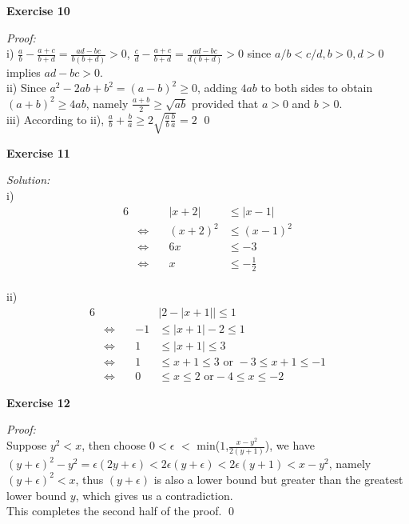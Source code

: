 \documentclass[12pt]{article}
\begin{document}
 \textbf{Exercise 10}\par
\textit{Proof: }\\
i) $\frac{a}{b}-\frac{a+c}{b+d}=\frac{ad-bc}{b(b+d)}>0$, $\frac{c}{d}-\frac{a+c}{b+d}=\frac{ad-bc}{d(b+d)}>0$ since $a/b <c/d, b>0, d>0$ implies $ad-bc>0$.\\
ii) Since $a^2-2ab+b^2=(a-b)^2\ge 0$, adding $4ab$ to both sides to obtain $(a+b)^2\ge4ab$, namely $\frac{a+b}{2}\ge\sqrt{ab}$ provided that $a>0$ and $b>0$.\\
iii) According to ii), $\frac{a}{b}+\frac{b}{a}\ge2\sqrt{\frac{a}{b}\frac{b}{a}}=2$
\qed
\par
\textbf{Exercise 11}\par
\textit{Solution: }\\
i)\begin{alignat*}{6}
&\quad &|x+2|    &\leq|x-1|\\
&\iff      \quad&(x+2)^2&\leq(x-1)^2\\
&\iff      &6x        &\leq-3\\
&\iff      &x          &\leq -\frac{1}{2}
\end{alignat*}\\
ii)\begin{alignat*}{6}
&     &   &|2-|x+1||\leq1\\
&\iff \quad&-1&\leq|x+1|-2\leq     1\\
&\iff &1 &\leq|x+1|\leq        3\\
&\iff &1 &\leq x+1\leq         3\text{ or } -3\leq x+1\leq-1\\
&\iff &0 &\leq x\leq             2\text{ or} -4\leq x\leq-2
\end{alignat*}
\par
\textbf{Exercise 12}\par
\textit{Proof: }\\
Suppose $y^2<x$, then choose $0<\epsilon$ $<$ min($1$,$\frac{x-y^2}{2(y+1)}$), we have 
$(y+\epsilon)^2-y^2= \epsilon(2y+\epsilon)<2\epsilon(y+\epsilon)<2\epsilon(y+1)<x-y^2$, namely $(y+\epsilon)^2<x$, thus $(y+\epsilon)$ is also a  lower bound but greater than the greatest lower bound $y$, which gives us a contradiction.
\\This completes the second half of the proof.
\qed
\end{document}

